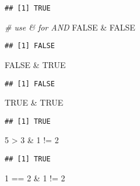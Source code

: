 \documentclass[
]{article}
\newenvironment{Shaded}{\begin{snugshade}}{\end{snugshade}}
\newcommand{\CommentTok}[1]{\textcolor[rgb]{0.56,0.35,0.01}{\textit{#1}}}
\newcommand{\ConstantTok}[1]{\textcolor[rgb]{0.00,0.00,0.00}{#1}}
\newcommand{\DecValTok}[1]{\textcolor[rgb]{0.00,0.00,0.81}{#1}}
\newcommand{\SpecialCharTok}[1]{\textcolor[rgb]{0.00,0.00,0.00}{#1}}
\begin{document}
\begin{verbatim}
## [1] TRUE
\end{verbatim}

\begin{Shaded}
\begin{Highlighting}[]
\CommentTok{\# use \& for AND}
\ConstantTok{FALSE} \SpecialCharTok{\&} \ConstantTok{FALSE}
\end{Highlighting}
\end{Shaded}

\begin{verbatim}
## [1] FALSE
\end{verbatim}

\begin{Shaded}
\begin{Highlighting}[]
\ConstantTok{FALSE} \SpecialCharTok{\&} \ConstantTok{TRUE}
\end{Highlighting}
\end{Shaded}

\begin{verbatim}
## [1] FALSE
\end{verbatim}

\begin{Shaded}
\begin{Highlighting}[]
\ConstantTok{TRUE} \SpecialCharTok{\&} \ConstantTok{TRUE}
\end{Highlighting}
\end{Shaded}

\begin{verbatim}
## [1] TRUE
\end{verbatim}

\begin{Shaded}
\begin{Highlighting}[]
\DecValTok{5} \SpecialCharTok{\textgreater{}} \DecValTok{3} \SpecialCharTok{\&} \DecValTok{1} \SpecialCharTok{!=} \DecValTok{2}
\end{Highlighting}
\end{Shaded}

\begin{verbatim}
## [1] TRUE
\end{verbatim}

\begin{Shaded}
\begin{Highlighting}[]
\DecValTok{1} \SpecialCharTok{==} \DecValTok{2} \SpecialCharTok{\&} \DecValTok{1} \SpecialCharTok{!=} \DecValTok{2}
\end{Highlighting}
\end{Shaded}
\end{document}
